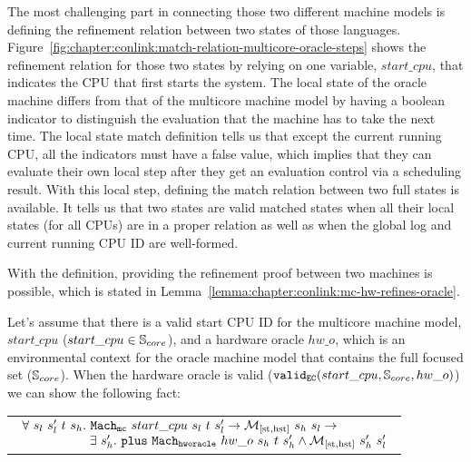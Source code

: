 The most challenging part in connecting those two different machine models is defining the refinement relation between two states of those languages. 
Figure~\ref{fig:chapter:conlink:match-relation-multicore-oracle-steps} shows the 
refinement relation for those two states by relying on one variable, $start\_cpu$, that indicates the CPU that first starts the system. 
The local state of the oracle machine differs from that of the multicore machine model by having a boolean indicator 
to distinguish the evaluation that the machine has to take the next time.
The local state match definition tells us that except the current running CPU, all the indicators must have a false value,
which implies that they can evaluate their own local step after they get an evaluation control via a scheduling result.
 With this local step, 
defining the match relation between two full states is available.
 It tells us that 
 two states are valid matched states when all  their local states (for all CPUs) are in a proper relation as well as when the global log and  current running CPU ID are well-formed. 


%
%

With the definition, providing the refinement proof between two machines is possible,
which is stated in Lemma~\ref{lemma:chapter:conlink:mc-hw-refines-oracle}.
\begin{lemma}
\label{lemma:chapter:conlink:mc-hw-refines-oracle}
Let's assume that there is a valid start CPU ID for the multicore machine model, 
$start\_cpu$ ($start\_cpu \in {\mathbb{S}_{core}}$), and a hardware oracle $hw\_o$,  
which is an environmental context for the oracle machine model that contains the full focused set (${\mathbb{S}_{core}}$).
When the hardware oracle is valid ($ {{\mathrm{\texttt{valid}}}_{{\mathrm{\texttt{EC}}}}}({start\_cpu}, {{\mathbb{S}_{core}}}, {hw\_o})$) we can show the following fact:
\begin{center}
\begin{tabular}{P{0.95\textwidth}}
$
\begin{array}{l}
\forall \ s_l \ s_l' \ t \ s_h . \ \hardwarestep{start\_cpu}{s_l}{t}{s_l'} \rightarrow  \matchstatehstate{s_h}{s_l} \rightarrow \\
\ \ \ \ \ \ \ \ \ \ \ \ \ \ \ \ \exists\ s_h' . \  \ccplusstep{\oraclestep{hw\_o}{s_h}{t}{s_h'}} \wedge  \matchstatehstate{s_h'}{s_l'}\\
\end{array}
$
\end{tabular}
\end{center}
\end{lemma}

